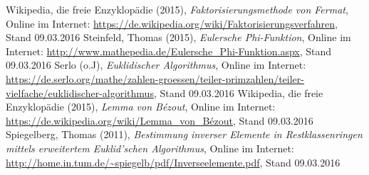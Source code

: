 \documentclass[a4paper, fontsize=12pt, parskip=full, toc=bibliographynumbered]{scrreprt}
\begin{document}
\begin{thebibliography}{9}
 Wikipedia, die freie Enzyklopädie (2015), \emph{Faktorisierungsmethode von Fermat}, Online im Internet: \url{https://de.wikipedia.org/wiki/Faktorisierungsverfahren}, Stand 09.03.2016
 Steinfeld, Thomas (2015), \emph{Eulersche Phi-Funktion}, Online im Internet: \url{http://www.mathepedia.de/Eulersche_Phi-Funktion.aspx}, Stand 09.03.2016
 Serlo (o.J), \emph{Euklidischer Algorithmus}, Online im Internet: \url{https://de.serlo.org/mathe/zahlen-groessen/teiler-primzahlen/teiler-vielfache/euklidischer-algorithmus}, Stand 09.03.2016
 Wikipedia, die freie Enzyklopädie (2015), \emph{Lemma von Bézout}, Online im Internet: \url{https://de.wikipedia.org/wiki/Lemma_von_Bézout}, Stand 09.03.2016
 Spiegelberg, Thomas (2011), \emph{Bestimmung inverser Elemente in Restklassenringen mittels erweitertem Euklid'schen Algorithmus}, Online im Internet: \url{http://home.in.tum.de/~spiegelb/pdf/Inverseelemente.pdf}, Stand 09.03.2016
\end{thebibliography}
\end{document}
